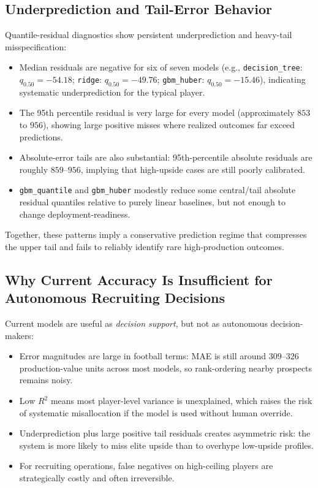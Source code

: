 \subsection{Underprediction and Tail-Error Behavior}

Quantile-residual diagnostics show persistent underprediction and heavy-tail misspecification:
\begin{itemize}
    \item Median residuals are negative for six of seven models (e.g., \texttt{decision\_tree}: $q_{0.50}=-54.18$; \texttt{ridge}: $q_{0.50}=-49.76$; \texttt{gbm\_huber}: $q_{0.50}=-15.46$), indicating systematic underprediction for the typical player.
    \item The 95th percentile residual is very large for every model (approximately $853$ to $956$), showing large positive misses where realized outcomes far exceed predictions.
    \item Absolute-error tails are also substantial: 95th-percentile absolute residuals are roughly $859$--$956$, implying that high-upside cases are still poorly calibrated.
    \item \texttt{gbm\_quantile} and \texttt{gbm\_huber} modestly reduce some central/tail absolute residual quantiles relative to purely linear baselines, but not enough to change deployment-readiness.
\end{itemize}

Together, these patterns imply a conservative prediction regime that compresses the upper tail and fails to reliably identify rare high-production outcomes.

\subsection{Why Current Accuracy Is Insufficient for Autonomous Recruiting Decisions}

Current models are useful as \emph{decision support}, but not as autonomous decision-makers:
\begin{itemize}
    \item Error magnitudes are large in football terms: MAE is still around $309$--$326$ production-value units across most models, so rank-ordering nearby prospects remains noisy.
    \item Low $R^2$ means most player-level variance is unexplained, which raises the risk of systematic misallocation if the model is used without human override.
    \item Underprediction plus large positive tail residuals creates asymmetric risk: the system is more likely to miss elite upside than to overhype low-upside profiles.
    \item For recruiting operations, false negatives on high-ceiling players are strategically costly and often irreversible.
\end{itemize}

